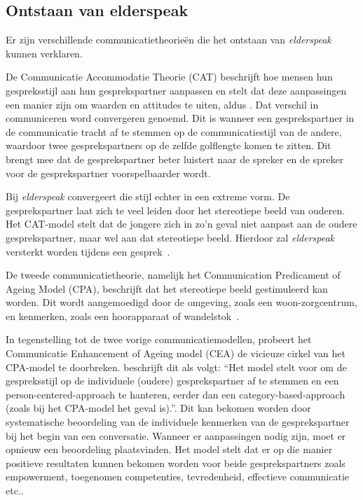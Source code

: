 \subsection{Ontstaan van elderspeak}
Er zijn verschillende communicatietheorieën die het ontstaan van \textit{elderspeak} kunnen verklaren.

De Communicatie Accommodatie Theorie (CAT) beschrijft hoe mensen hun gespreksstijl aan hun gesprekspartner aanpassen en stelt dat deze aanpassingen een manier zijn om waarden en attitudes te uiten, aldus \textcite{Campens2021}. Dat verschil in communiceren word convergeren genoemd. Dit is wanneer een gesprekspartner in de communicatie tracht af te stemmen op de communicatiestijl van de andere, waardoor twee gesprekspartners op de zelfde golflengte komen te zitten. Dit brengt mee dat de gesprekspartner beter luistert naar de spreker en de spreker voor de gesprekspartner voorspelbaarder wordt.

Bij \textit{elderspeak} convergeert die stijl echter in een extreme vorm. De gesprekspartner laat zich te veel leiden door het stereotiepe beeld van ouderen. Het CAT-model stelt dat de jongere zich in zo'n geval niet aanpast aan de oudere gesprekspartner, maar wel aan dat stereotiepe beeld. Hierdoor zal \textit{elderspeak} versterkt worden tijdens een gesprek~\autocite{Hehman2015}.

De tweede communicatietheorie, namelijk het Communication Predicament of Ageing Model (CPA), beschrijft dat het stereotiepe beeld gestimuleerd kan worden. Dit wordt aangemoedigd door de omgeving, zoals een woon-zorgcentrum, en kenmerken, zoals een hoorapparaat of wandelstok~\autocite{Hehman2015}.

In tegenstelling tot de twee vorige communicatiemodellen, probeert het Communicatie Enhancement of Ageing model (CEA) de vicieuze cirkel van het CPA-model te doorbreken. \textcite{Campens2021} beschrijft dit als volgt: ``Het model stelt voor om de gespreksstijl op de individuele (oudere) gesprekspartner af te stemmen en een person-centered-approach te hanteren, eerder dan een category-based-approach (zoals bij het CPA-model het geval is).''. Dit kan bekomen worden door systematische beoordeling van de individuele kenmerken van de gesprekspartner bij het begin van een conversatie. Wanneer er aanpassingen nodig zijn, moet er opnieuw een beoordeling plaatsvinden. Het model stelt dat er op die manier positieve resultaten kunnen bekomen worden voor beide gesprekspartners zoals empowerment, toegenomen competenties, tevredenheid, effectieve communicatie etc.\~\autocite{Hehman2015}.

